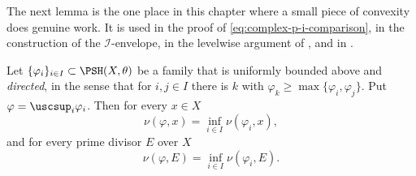 The next lemma is the one place in this chapter where a small piece of
convexity does genuine work.  It is used in the proof of
\eqref{eq:complex-p-i-comparison}, in the construction of the
\(\mathcal I\)-envelope, in the levelwise argument of
, and in .

\begin{lemma}
\label{lem:ch51-lelong-increasing}
Let \(\{\varphi_i\}_{i\in I}\subset\PSH(X,\theta)\) be a family that is
uniformly bounded above and \emph{directed}, in the sense that for
\(i,j\in I\) there is \(k\) with \(\varphi_k\geq\max\{\varphi_i,
\varphi_j\}\).  Put \(\varphi=\uscsup_i\varphi_i\).  Then for every
\(x\in X\)
\[
 \nu(\varphi,x)=\inf_{i\in I}\nu(\varphi_i,x),
\]
and for every prime divisor \(E\) over \(X\)
\[
 \nu(\varphi,E)=\inf_{i\in I}\nu(\varphi_i,E).
\]
\end{lemma}

